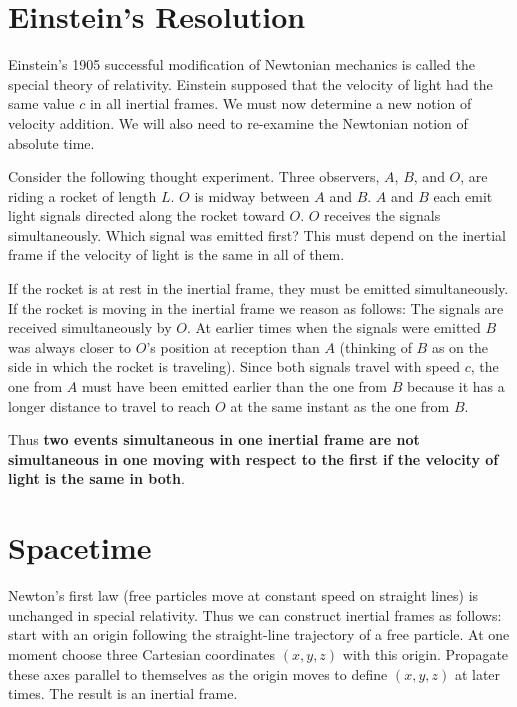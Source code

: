 \section{Einstein's Resolution}
\label{sec:einRel}

Einstein's 1905 successful modification of Newtonian mechanics is called the special theory of relativity. Einstein supposed that the velocity of light had the same value $c$ in all inertial frames. We must now determine a new notion of velocity addition. We will also need to re-examine the Newtonian notion of absolute time.

Consider the following thought experiment. Three observers, $A$, $B$, and $O$, are riding a rocket of length $L$. $O$ is midway between $A$ and $B$. $A$ and $B$ each emit light signals directed along the rocket toward $O$. $O$ receives the signals simultaneously. Which signal was emitted first? This must depend on the inertial frame if the velocity of light is the same in all of them. 

If the rocket is at rest in the inertial frame, they must be emitted simultaneously. If the rocket is moving in the inertial frame we reason as follows: The signals are received simultaneously by $O$. At earlier times when the signals were emitted $B$ was always closer to  $O$'s position at reception than $A$ (thinking of $B$ as on the side in which the rocket is traveling). Since both signals travel with speed $c$, the one from $A$ must have been emitted earlier than the one from $B$ because it has a longer distance to travel to reach $O$ at the same instant as the one from $B$.

\begin{rmk}
    Thus \textbf{two events simultaneous in one inertial frame are not simultaneous in one moving with respect to the first if the velocity of light is the same in both}.
\end{rmk}


\section{Spacetime}
\label{sec:spaceTime}

Newton's first law (free particles move at constant speed on straight lines) is unchanged in special relativity. Thus we can construct inertial frames as follows: start with an origin following the straight-line trajectory of a free particle. At one moment choose three Cartesian coordinates $(x,y,z)$ with this origin. Propagate these axes parallel to themselves as the origin moves to define $(x,y,z)$ at later times. The result is an inertial frame.

